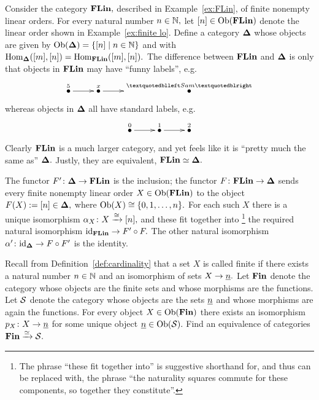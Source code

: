 \documentclass[CT4S-EN-RU]{subfiles}
\begin{document}
\begin{exampleRUS}\label{ex:indiscrete cat equiv to terminal}
\end{exampleRUS}

\begin{exampleENG}\label{ex:finite linear orders}
Consider the category ${\mathbf{FLin}},$ described in Example~\ref{ex:FLin}, of finite nonempty linear orders. For every natural number $n\in{\mathbb N},$ let $[n]\in\textnormal{Ob}({\mathbf{FLin}})$ denote the linear order shown in Example~\ref{ex:finite lo}. Define a category ${\mathbf{\Delta}}$ whose objects are given by $\textnormal{Ob}({\mathbf{\Delta}})=\{[n]{\;|\;}n\in{\mathbb N}\}$ and with $\textnormal{Hom}_{{\mathbf{\Delta}}}([m],[n])=\textnormal{Hom}_{{\mathbf{FLin}}}([m],[n]).$ The difference between ${\mathbf{FLin}}$ and ${\mathbf{\Delta}}$ is only that objects in ${\mathbf{FLin}}$ may have “funny labels”, e.g. 
$$\xymatrix{\LMO{5}\ar[r]&\LMO{x}\ar[r]&\LMO{“Sam”}}$$ 
whereas objects in ${\mathbf{\Delta}}$ all have standard labels, e.g.
$$\xymatrix{\LMO{0}\ar[r]&\LMO{1}\ar[r]&\LMO{2}}$$
Clearly ${\mathbf{FLin}}$ is a much larger category, and yet feels like it is “pretty much the same as” ${\mathbf{\Delta}}.$ Justly, they are equivalent, ${\mathbf{FLin}}\simeq{\mathbf{\Delta}}.$ 

The functor $F'\colon{\mathbf{\Delta}}\rightarrow{\mathbf{FLin}}$ is the inclusion; the functor $F\colon{\mathbf{FLin}}\rightarrow{\mathbf{\Delta}}$ sends every finite nonempty linear order $X\in\textnormal{Ob}({\mathbf{FLin}})$ to the object $F(X):=[n]\in{\mathbf{\Delta}},$ where $\textnormal{Ob}(X)\cong\{0,1,\ldots,n\}.$ For each such $X$ there is a unique isomorphism $\alpha_X\colon X\xrightarrow{\cong}[n],$ and these fit together into
\footnote{The phrase “these fit together into” is suggestive shorthand for, and thus can be replaced with, the phrase “the naturality squares commute for these components, so together they constitute”.}
the required natural isomorphism $\textnormal{id}_{{\mathbf{FLin}}}\rightarrow F'\circ F.$ The other natural isomorphism $\alpha'\colon\textnormal{id}_{{\mathbf{\Delta}}}\rightarrow F\circ F'$ is the identity.
\end{exampleENG}

\begin{exampleRUS}\label{ex:finite linear orders}
\end{exampleRUS}

\begin{exerciseENG}
Recall from Definition~\ref{def:cardinality} that a set $X$ is called finite if there exists a natural number $n\in{\mathbb N}$ and an isomorphism of sets $X\rightarrow\underline{n}.$ Let ${\mathbf{Fin}}$ denote the category whose objects are the finite sets and whose morphisms are the functions. Let $\mathcal{S}$ denote the category whose objects are the sets $\underline{n}$ and whose morphisms are again the functions. For every object $X\in\textnormal{Ob}({\mathbf{Fin}})$ there exists an isomorphism $p_X\colon X\rightarrow\underline{n}$ for some unique object $\underline{n}\in\textnormal{Ob}(\mathcal{S}).$ Find an equivalence of categories ${\mathbf{Fin}}\xrightarrow{\simeq}\mathcal{S}.$ 
\end{exerciseENG}
\end{document}
